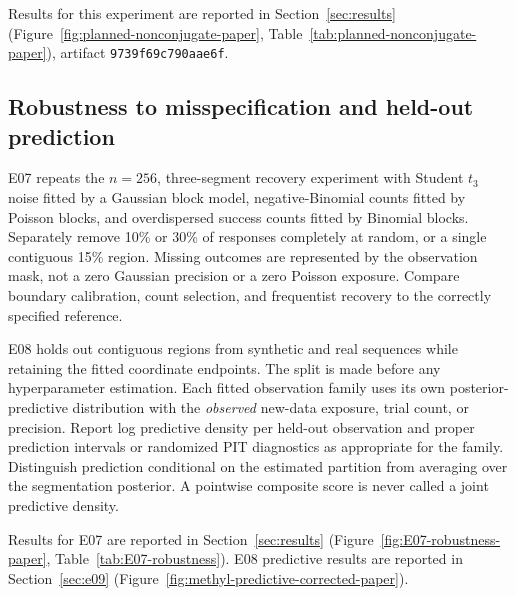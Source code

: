 Results for this experiment are reported in Section~\ref{sec:results} (Figure~\ref{fig:planned-nonconjugate-paper}, Table~\ref{tab:planned-nonconjugate-paper}), artifact \texttt{9739f69c790aae6f}.

\subsection{Robustness to misspecification and held-out prediction}
E07 repeats the $n=256$, three-segment recovery experiment with Student
$t_3$ noise fitted by a Gaussian block model, negative-Binomial counts fitted
by Poisson blocks, and overdispersed success counts fitted by Binomial blocks.
Separately remove 10\% or 30\% of responses completely at random, or a single
contiguous 15\% region. Missing outcomes are represented by the observation
mask, not a zero Gaussian precision or a zero Poisson exposure. Compare
boundary calibration, count selection, and frequentist recovery to the
correctly specified reference.

E08 holds out contiguous regions from synthetic and real sequences while
retaining the fitted coordinate endpoints. The split is made before any
hyperparameter estimation. Each fitted observation family uses its own
posterior-predictive distribution with the \emph{observed} new-data exposure,
trial count, or precision. Report log predictive density per held-out
observation and proper prediction intervals or randomized PIT diagnostics as
appropriate for the family. Distinguish prediction conditional on the
estimated partition from averaging over the segmentation posterior. A
pointwise composite score is never called a joint predictive density.

Results for E07 are reported in Section~\ref{sec:results}
(Figure~\ref{fig:E07-robustness-paper}, Table~\ref{tab:E07-robustness}).
E08 predictive results are reported in Section~\ref{sec:e09}
(Figure~\ref{fig:methyl-predictive-corrected-paper}).

